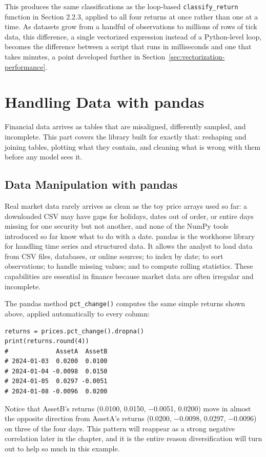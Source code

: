 \documentclass[../ai_in_finance]{subfiles}
\begin{document}
This produces the same classifications as the loop-based \texttt{classify\_return} function in Section 2.2.3, applied to all four returns at once rather than one at a time. As datasets grow from a handful of observations to millions of rows of tick data, this difference, a single vectorized expression instead of a Python-level loop, becomes the difference between a script that runs in milliseconds and one that takes minutes, a point developed further in Section~\ref{sec:vectorization-performance}.

\section{Handling Data with pandas}

Financial data arrives as tables that are misaligned, differently sampled, and incomplete. This part covers the library built for exactly that: reshaping and joining tables, plotting what they contain, and cleaning what is wrong with them before any model sees it.

\subsection{Data Manipulation with pandas}

Real market data rarely arrives as clean as the toy price arrays used so far: a downloaded CSV may have gaps for holidays, dates out of order, or entire days missing for one security but not another, and none of the NumPy tools introduced so far know what to do with a date. pandas is the workhorse library for handling time series and structured data. It allows the analyst to load data from CSV files, databases, or online sources; to index by date; to sort observations; to handle missing values; and to compute rolling statistics. These capabilities are essential in finance because market data are often irregular and incomplete.

The pandas method \texttt{pct\_change()} computes the same simple returns shown above, applied automatically to every column:

\begin{verbatim}
returns = prices.pct_change().dropna()
print(returns.round(4))
#             AssetA  AssetB
# 2024-01-03  0.0200  0.0100
# 2024-01-04 -0.0098  0.0150
# 2024-01-05  0.0297 -0.0051
# 2024-01-08 -0.0096  0.0200
\end{verbatim}

Notice that AssetB's returns (0.0100, 0.0150, $-$0.0051, 0.0200) move in almost the opposite direction from AssetA's returns (0.0200, $-$0.0098, 0.0297, $-$0.0096) on three of the four days. This pattern will reappear as a strong negative correlation later in the chapter, and it is the entire reason diversification will turn out to help so much in this example.
\end{document}
